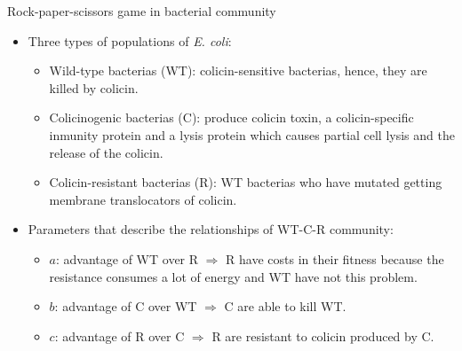 \begin{frame}{Rock-paper-scissors game in bacterial community}
    \begin{itemize}
		\item Three types of populations of \textit{E. coli}: 
		\begin{itemize}
			\item Wild-type bacterias (WT): colicin-sensitive bacterias, hence, they are killed by colicin. 
			\item Colicinogenic bacterias (C): produce colicin toxin, a colicin-specific inmunity protein and a lysis protein which causes partial cell lysis and the release of the colicin.
			\item Colicin-resistant bacterias (R): WT bacterias who have mutated getting membrane translocators of colicin.
		\end{itemize}
		\item Parameters that describe the relationships of WT-C-R community:
		\begin{itemize}
			\item $a$: advantage of WT over R $\Rightarrow$ R have costs in their fitness because the resistance consumes a lot of energy and WT have not this problem.
			\item $b$: advantage of C over WT $\Rightarrow$ C are able to kill WT.
			\item $c$: advantage of R over C $\Rightarrow$ R are resistant to colicin produced by C. 
		\end{itemize}
		
    \end{itemize}
\end{frame}

